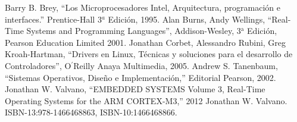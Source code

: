 \documentclass{article}
\begin{document}
\eject
\begin{thebibliography}{9}
Barry B. Brey, ``Los Microprocesadores Intel, 
Arquitectura, programaci\'on e interfaces.'' Prentice-Hall 
3$^{a}$ Edici\'on, 1995.
Alan Burns, Andy Wellings, ``Real-Time Systems and 
Programming Languages'', Addison-Wesley, 3$^{\mbox{a}}$ Edici\'on, 
Pearson Education Limited 2001.
Jonathan Corbet, Alessandro Rubini, Greg Kroah-Hartman, 
``Drivers en Linux, T\'ecnicas y soluciones para el desarrollo de 
Controladores'', O$^{\prime}$Reilly Anaya Multimedia, 2005.
Andrew S. Tanenbaum, ``Sistemas Operativos, 
Dise\~no e Implementaci\'on,'' Editorial Pearson, 2002.
Jonathan W. Valvano, ``EMBEDDED SYSTEMS Volume 3, Real-Time Operating 
Systems for the ARM CORTEX-M3,'' 2012 Jonathan W. Valvano. ISBN-13:978-1466468863, 
ISBN-10:1466468866. 
\end{thebibliography}
\end{document}
